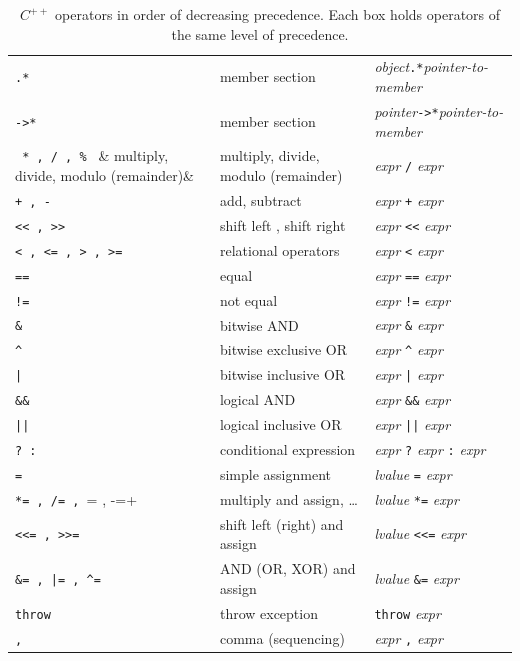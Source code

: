 \begin{table}[hbt]
\begin{center}
\begin{footnotesize}
\begin{tabular}{|lll|}
    \hline
    \verb+.*+ & member section & {\it object}\verb+.*+{\it pointer-to-member} \\
    \verb+->*+ & member section & {\it pointer}\verb+->*+{\it pointer-to-member} \\
    \hline
    \verb& * , / , % & & multiply, divide, modulo (remainder)
                         & {\it expr} \verb+/+ {\it expr} \\
    \hline
    \verb&+ , -& & add, subtract & {\it expr} \verb&+& {\it expr} \\
    \hline
    \verb+<< , >>+ & shift left , shift right
                   & {\it expr} \verb+<<+ {\it expr} \\
    \hline
    \verb+< , <= , > , >=+ & relational operators
                & {\it expr} \verb+<+ {\it expr} \\
    \hline
    \verb+==+ & equal & {\it expr} \verb+==+ {\it expr} \\
    \verb+!=+ & not equal & {\it expr} \verb+!=+ {\it expr} \\
    \hline
    \verb+&+ & bitwise AND & {\it expr} \verb+&+ {\it expr} \\
    \hline
    \verb+^+ & bitwise exclusive OR & {\it expr} \verb+^+ {\it expr} \\
    \hline
    \verb+|+ & bitwise inclusive OR & {\it expr} \verb+|+ {\it expr} \\
    \hline
    \verb+&&+ & logical AND & {\it expr} \verb+&&+ {\it expr} \\
    \hline
    \verb+||+ & logical inclusive OR & {\it expr} \verb+||+ {\it expr} \\
    \hline
    \verb+? :+ & conditional expression & {\it expr} \verb+?+ {\it expr}
                            \verb+:+ {\it expr} \\
    \hline
    \verb+=+ & simple assignment & {\it lvalue} \verb+=+ {\it expr} \\
    \verb+*= , /= , += , -=+ & multiply and assign, \dots
                                 & {\it lvalue} \verb+*=+ {\it expr} \\
    \verb+<<= , >>=+ & shift left (right) and assign & {\it lvalue} \verb+<<=+ {\it expr} \\
    \verb+&= , |= , ^=+ & AND (OR, XOR) and assign & {\it lvalue} \verb+&=+ {\it expr} \\
    \hline
    \verb+throw+ & throw exception & \verb+throw+ {\it expr} \\
    \hline
    \verb+,+ & comma (sequencing) & {\it expr} \verb+,+ {\it expr} \\
    \hline
   \end{tabular}
   \end{footnotesize}
 \end{center}
 \caption{$C^{++}$ operators in order of decreasing precedence. Each
           box holds operators of the same level of precedence.
                \label{basiccppCppops}}
\end{table}


